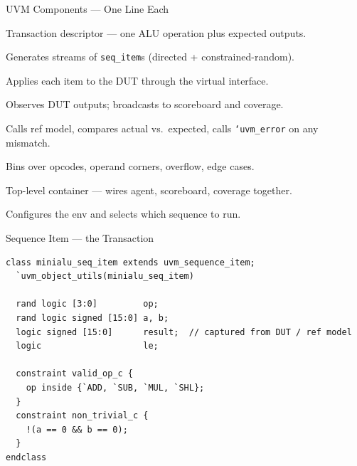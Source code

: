 \documentclass[aspectratio=169]{beamer}
\begin{document}
\begin{frame}{UVM Components --- One Line Each}
  \begin{description}[style=nextline, font=\ttfamily\small]
    \item[seq\_item]   Transaction descriptor --- one ALU operation plus expected outputs.
    \item[sequence]    Generates streams of \texttt{seq\_item}s (directed + constrained-random).
    \item[driver]      Applies each item to the DUT through the virtual interface.
    \item[monitor]     Observes DUT outputs; broadcasts to scoreboard and coverage.
    \item[scoreboard]  Calls ref model, compares actual vs.\ expected,
                       calls \texttt{`uvm\_error} on any mismatch.
    \item[coverage]    Bins over opcodes, operand corners, overflow, edge cases.
    \item[env]         Top-level container --- wires agent, scoreboard, coverage together.
    \item[test]        Configures the env and selects which sequence to run.
  \end{description}
\end{frame}


\begin{frame}[fragile]{Sequence Item --- the Transaction}
\begin{verbatim}
class minialu_seq_item extends uvm_sequence_item;
  `uvm_object_utils(minialu_seq_item)

  rand logic [3:0]         op;
  rand logic signed [15:0] a, b;
  logic signed [15:0]      result;  // captured from DUT / ref model
  logic                    le;

  constraint valid_op_c {
    op inside {`ADD, `SUB, `MUL, `SHL};
  }
  constraint non_trivial_c {
    !(a == 0 && b == 0);
  }
endclass
\end{verbatim}
\end{frame}
\end{document}
